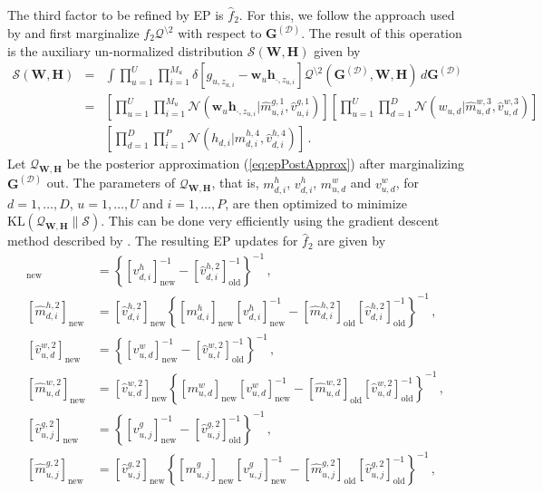 \documentclass{article}
\begin{document}
The third factor to be refined by EP is $\hat{f}_2$. For this, we follow the approach used by \cite{stern2009}
and first marginalize $f_2\mathcal{Q}^{\setminus 2}$ with respect to $\mathbf{G}^{(\mathcal{D})}$.
The result of this operation is the auxiliary un-normalized distribution $\mathcal{S}(\mathbf{W},\mathbf{H})$ given by
\begin{eqnarray}
\mathcal{S}(\mathbf{W},\mathbf{H}) & = & \int 
\prod_{u=1}^{U} \prod_{i=1}^{M_u}\delta[g_{u,z_{u,i}}-\mathbf{w}_u\mathbf{h}_{\cdot,z_{u,i}}]
\mathcal{Q}^{\setminus 2 }(\mathbf{G}^{(\mathcal{D})},\mathbf{W},\mathbf{H})\,d\mathbf{G}^{(\mathcal{D})}\nonumber\\
& = & \left[\prod_{u=1}^{U}
\prod_{i=1}^{M_u}\mathcal{N}(\mathbf{w}_u\mathbf{h}_{\cdot,z_{u,i}}|\hat{m}^{g,1}_{u,i},\hat{v}^{g,1}_{u,i})\right]
\left[ \prod_{u=1}^U\prod_{d=1}^D \mathcal{N}(w_{u,d}|\hat{m}^{w,3}_{u,d},\hat{v}^{w,3}_{u,d}) \right]\nonumber \\
& & \left[ \prod_{d=1}^D\prod_{i=1}^P \mathcal{N}(h_{d,i}|\hat{m}^{h,4}_{d,i},\hat{v}^{h,4}_{d,i}) \right]\,.
\end{eqnarray}
Let $\mathcal{Q}_{\mathbf{W},\mathbf{H}}$ be the posterior approximation (\ref{eq:epPostApprox}) after marginalizing $\mathbf{G}^{(\mathcal{D})}$ out.
The parameters of $\mathcal{Q}_{\mathbf{W},\mathbf{H}}$, that is, $m_{d,i}^{h}$,
$v_{d,i}^{h}$, $m_{u,d}^{w}$ and $v_{u,d}^{w}$, for $d = 1,\ldots,D$, $u=1,\ldots,U$ and $i = 1,\ldots,P$,
are then optimized to minimize $\text{KL}(\mathcal{Q}_{\mathbf{W},\mathbf{H}}\|\mathcal{S})$.
This can be done very efficiently using the gradient descent method described by \cite{raiko2007}. The resulting EP updates for $\hat{f}_2$ are
given by
\begin{align}
[\hat{v}_{d,i}^{h,2}]_\text{new} & =
\left\{ [v_{d,i}^{h}]_\text{new}^{-1} - [\hat{v}_{d,i}^{h,2} ]_\text{old}^{-1}\right\}^{-1}\,,\\
[\hat{m}_{d,i}^{h,2}]_\text{new} & =
[\hat{v}_{d,i}^{h,2}]_\text{new} \left\{[ m_{d,i}^{h}]_\text{new} 
[v_{d,i}^{h}]_\text{new}^{-1} - [\hat{m}_{d,i}^{h,2}]_\text{old} [\hat{v}_{d,i}^{h,2}]_\text{old}^{-1}\right\}^{-1}\,,\\
[\hat{v}_{u,d}^{w,2}]_\text{new} & =
\left\{ [v_{u,d}^{w}]_\text{new}^{-1} - [\hat{v}_{u,l}^{w,2} ]_\text{old}^{-1}\right\}^{-1}\,,\\
[\hat{m}_{u,d}^{w,2}]_\text{new} & =
[\hat{v}_{u,d}^{w,2}]_\text{new} \left\{[ m_{u,d}^{w}]_\text{new} 
[v_{u,d}^{w}]_\text{new}^{-1} - [\hat{m}_{u,d}^{w,2}]_\text{old} [\hat{v}_{u,d}^{w,2}]_\text{old}^{-1}\right\}^{-1}\,,\\
[\hat{v}_{u,j}^{g,2}]_\text{new} & =
\left\{ [v_{u,j}^{g}]_\text{new}^{-1} - [\hat{v}_{u,j}^{g,2} ]_\text{old}^{-1}\right\}^{-1}\,,\\
[\hat{m}_{u,j}^{g,2}]_\text{new} & =
[\hat{v}_{u,j}^{g,2}]_\text{new} \left\{[ m_{u,j}^{g}]_\text{new} 
[v_{u,j}^{g}]_\text{new}^{-1} - [\hat{m}_{u,j}^{g,2}]_\text{old} [\hat{v}_{u,j}^{g,2}]_\text{old}^{-1}\right\}^{-1}\,,
\end{align}
\end{document}

